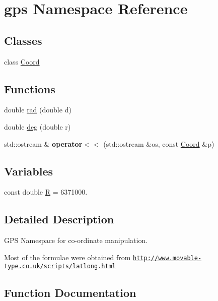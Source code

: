 \hypertarget{namespacegps}{}\section{gps Namespace Reference}
\label{namespacegps}
\subsection*{Classes}
\begin{DoxyCompactItemize}
\item 
class \hyperlink{classgps_1_1Coord}{Coord}
\end{DoxyCompactItemize}
\subsection*{Functions}
\begin{DoxyCompactItemize}
\item 
double \hyperlink{namespacegps_ad44ea39876137fc96774486e3a60f004}{rad} (double d)
\item 
double \hyperlink{namespacegps_a5c00877fe5fce323f1c834c324018c8f}{deg} (double r)
\item 
\mbox{\label{namespacegps_a5fb543469635387159ce1b8e24f6f78a}} 
std\+::ostream \& {\bfseries operator$<$$<$} (std\+::ostream \&os, const \hyperlink{classgps_1_1Coord}{Coord} \&p)
\end{DoxyCompactItemize}
\subsection*{Variables}
\begin{DoxyCompactItemize}
\item 
const double \hyperlink{namespacegps_a336bcadf804afba736e0cf773b5a36e8}{R} = 6371000.
\end{DoxyCompactItemize}


\subsection{Detailed Description}
G\+PS Namespace for co-\/ordinate manipulation.

Most of the formulae were obtained from \href{http://www.movable-type.co.uk/scripts/latlong.html}{\tt http\+://www.\+movable-\/type.\+co.\+uk/scripts/latlong.\+html} 

\subsection{Function Documentation}
\mbox{\label{namespacegps_a5c00877fe5fce323f1c834c324018c8f}} 
